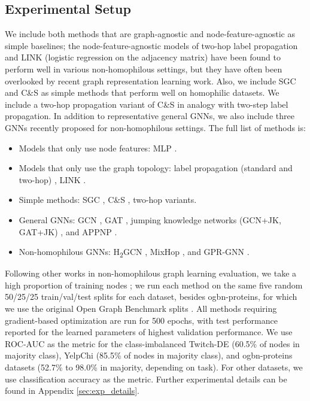 \documentclass[sigconf, balance=false]{acmart}
\begin{document}
\subsection{Experimental Setup}

We include both methods that are graph-agnostic and node-feature-agnostic as simple baselines; the node-feature-agnostic models of two-hop label propagation \cite{peel2017graph} and LINK (logistic regression on the adjacency matrix) \cite{zheleva2009to} have been found to perform well in various non-homophilous settings, but they have often been overlooked by recent graph representation learning work. Also, we include SGC \cite{wu2019simplifying} and C\&S \cite{huang2021combining} as simple methods that perform well on homophilic datasets. We include a two-hop propagation variant of C\&S in analogy with two-step label propagation. In addition to representative general GNNs, we also include three GNNs recently proposed for non-homophilous settings. The full list of methods is:
\begin{itemize}
\setlength\itemsep{3pt}
    \item Models that only use node features: MLP \cite{goodfellow2016deep}.
    \item Models that only use the graph topology: label propagation (standard and two-hop) \cite{zhou2004learning, peel2017graph}, LINK \cite{zheleva2009to}.
    \item Simple methods: SGC \cite{wu2019simplifying}, C\&S \cite{huang2021combining}, two-hop variants.
    \item General GNNs: GCN \cite{kipf2017semi}, GAT \cite{velivckovic2018graph}, jumping knowledge networks (GCN+JK, GAT+JK) \cite{xu2018representation}, and APPNP \cite{klicpera2019predict}.
    \item Non-homophilous GNNs: H\textsubscript{2}GCN \cite{zhu2020beyond}, MixHop \cite{abu2019mixhop}, and GPR-GNN \cite{chien2021adaptive}.
\end{itemize}


Following other works in non-homophilous graph learning evaluation, we take a high proportion of training nodes \cite{zhu2020beyond, pei2019geom, yan2021two}; we run each method on the same five random 50/25/25 train/val/test splits for each dataset, besides ogbn-proteins, for which we use the original Open Graph Benchmark splits \cite{hu2020open}. All methods requiring gradient-based optimization are run for 500 epochs, with test performance reported for the learned parameters of highest validation performance. We use ROC-AUC as the metric for the class-imbalanced Twitch-DE (60.5\% of nodes in majority class), YelpChi (85.5\% of nodes in majority class), and ogbn-proteins datasets (52.7\% to 98.0\% in majority, depending on task). For other datasets, we use classification accuracy as the metric. Further experimental details can be found in Appendix \ref{sec:exp_details}.
\end{document}
